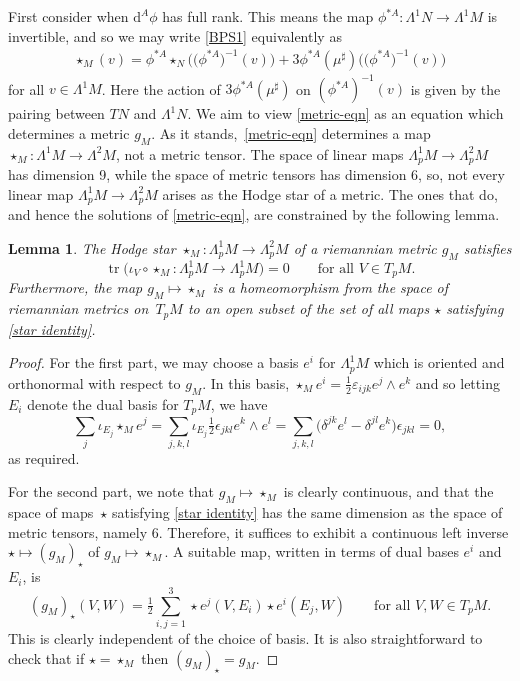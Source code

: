 \documentclass[pdftex]{sigma}
\newcommand{\1}{{\mathbb{1}}}
\def \d{\mathrm{d}}
\newcommand{\tr}{{\operatorname{tr}}}
\numberwithin{equation}{section}
\newtheorem{Lemma}[Theorem]{Lemma}
\begin{document}
First consider when $\d^A\phi$ has full rank. This means the map $\phi^{\ast A}\colon \Lambda^1N\to\Lambda^1M$ is invertible, and so we may write \eqref{BPS1} equivalently as
\begin{align}\label{metric-eqn}
 \star_{M}(v)=\phi^{\ast A}\star_{N}\big(\big(\phi^{\ast A}\big)^{-1}(v)\big)+3\phi^{\ast A}(\mu^\sharp)\big(\big(\phi^{\ast A}\big)^{-1}(v)\big)
\end{align}
for all $v\in\Lambda^1M$. Here the action of $3\phi^{\ast A}(\mu^\sharp)$ on $(\phi^{\ast A})^{-1}(v)$ is given by the pairing between $TN$ and $\Lambda^1N$. We aim to view \eqref{metric-eqn} as an equation which determines a metric $g_M$. As it stands,~\eqref{metric-eqn} determines a map $\star_{M}\colon \Lambda^1M\to\Lambda^2M$, not a metric tensor. The space of linear maps $\Lambda_p^1M\to\Lambda_p^2M$ has dimension 9, while the space of metric tensors has dimension 6, so, not every linear map $\Lambda_p^1M\to\Lambda_p^2M$ arises as the Hodge star of a metric. The ones that do, and hence the solutions of \eqref{metric-eqn}, are constrained by the following lemma.
\begin{Lemma}\label{lem:star-constraint}
The Hodge star $\star_{M}\colon \Lambda^1_pM\to\Lambda^2_pM$ of a riemannian metric $g_M$ satisfies
\begin{equation}
\label{star identity}
\tr\bigl(\iota_V\circ\star_M\colon \Lambda^1_pM\to\Lambda^1_pM\bigr)=0\qquad\text{for all }V\in T_pM.
\end{equation}
Furthermore, the map $g_M\mapsto \star_{M}$ is a homeomorphism from the space of riemannian metrics on~$T_pM$ to an open subset of the set of all maps $\star$ satisfying \eqref{star identity}.
\end{Lemma}
\begin{proof}
For the first part, we may choose a basis $e^i$ for $\Lambda^1_pM$ which is oriented and orthonormal with respect to $g_M$. In this basis, $\star_{M}e^i=\frac12 \varepsilon_{ijk}e^j\wedge e^k$ and so letting $E_i$ denote the dual basis for $T_pM$, we have{\samepage
\begin{equation*}
\sum_j \iota_{E_j}\star_{M} e^j = \sum_{j,k,l}\iota_{E_j} \tfrac{1}{2}\epsilon_{jkl}e^k\wedge e^l=\sum_{j,k,l}\big(\delta^{jk}e^l-\delta^{jl}e^k\big)\epsilon_{jkl}=0,
\end{equation*}
as required.}

For the second part, we note that $g_M\mapsto \star_{M}$ is clearly continuous, and that the space of maps~$\star$ satisfying \eqref{star identity} has the same dimension as the space of metric tensors, namely $6$. Therefore, it suffices to exhibit a continuous left inverse $\star\mapsto (g_M)_\star$ of $g_M\mapsto \star_{M}$. A suitable map, written in terms of dual bases $e^i$ and $E_i$, is
\begin{equation}\label{recover-metric}
(g_M)_\star(V,W) = \tfrac12 \sum_{i,j=1}^3 \star e^j(V,E_i)\star e^i(E_j,W)\qquad \text{for all } V,W\in T_pM.
\end{equation}
This is clearly independent of the choice of basis. It is also straightforward to check that if $\star=\star_{M}$ then $(g_M)_\star = g_M$.
\end{proof}
\end{document}
